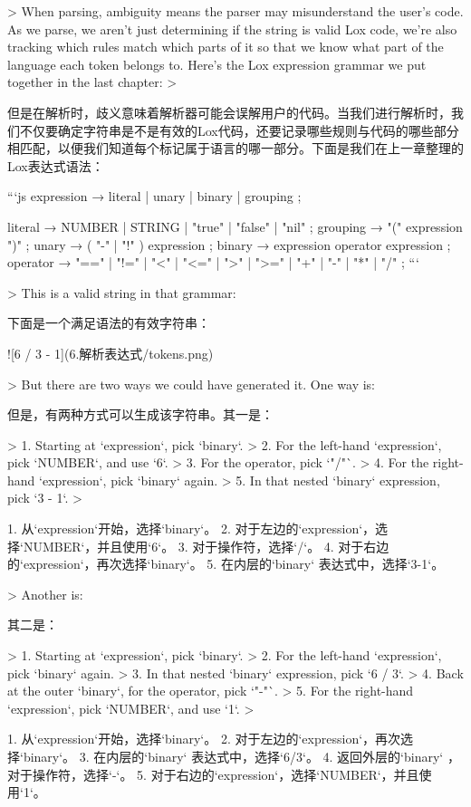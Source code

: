 \documentclass[cn,11pt,chinese]{elegantbook}
\begin{document}
> When parsing, ambiguity means the parser may misunderstand the user’s code. As we parse, we aren’t just determining if the string is valid Lox code, we’re also tracking which rules match which parts of it so that we know what part of the language each token belongs to. Here’s the Lox expression grammar we put together in the last chapter:
>

但是在解析时，歧义意味着解析器可能会误解用户的代码。当我们进行解析时，我们不仅要确定字符串是不是有效的Lox代码，还要记录哪些规则与代码的哪些部分相匹配，以便我们知道每个标记属于语言的哪一部分。下面是我们在上一章整理的Lox表达式语法：

```js
expression     → literal
               | unary
               | binary
               | grouping ;

literal        → NUMBER | STRING | "true" | "false" | "nil" ;
grouping       → "(" expression ")" ;
unary          → ( "-" | "!" ) expression ;
binary         → expression operator expression ;
operator       → "==" | "!=" | "<" | "<=" | ">" | ">="
               | "+"  | "-"  | "*" | "/" ;
```

> This is a valid string in that grammar:

下面是一个满足语法的有效字符串：

![6 / 3 - 1](6.解析表达式/tokens.png)

> But there are two ways we could have generated it. One way is:

但是，有两种方式可以生成该字符串。其一是：

> 1. Starting at `expression`, pick `binary`.
> 2. For the left-hand `expression`, pick `NUMBER`, and use `6`.
> 3. For the operator, pick `"/"`.
> 4. For the right-hand `expression`, pick `binary` again.
> 5. In that nested `binary` expression, pick `3 - 1`.
>

1. 从`expression`开始，选择`binary`。
2. 对于左边的`expression`，选择`NUMBER`，并且使用`6`。
3. 对于操作符，选择`/`。
4. 对于右边的`expression`，再次选择`binary`。
5. 在内层的`binary` 表达式中，选择`3-1`。

> Another is:

其二是：

> 1. Starting at `expression`, pick `binary`.
> 2. For the left-hand `expression`, pick `binary` again.
> 3. In that nested `binary` expression, pick `6 / 3`.
> 4. Back at the outer `binary`, for the operator, pick `"-"`.
> 5. For the right-hand `expression`, pick `NUMBER`, and use `1`.
>

1. 从`expression`开始，选择`binary`。
2. 对于左边的`expression`，再次选择`binary`。
3. 在内层的`binary` 表达式中，选择`6/3`。
4. 返回外层的`binary` ，对于操作符，选择`-`。
5. 对于右边的`expression`，选择`NUMBER`，并且使用`1`。
\end{document}

